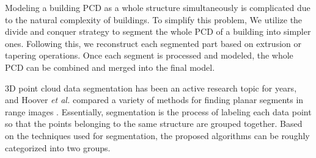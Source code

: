 Modeling a building PCD as a whole structure simultaneously
is complicated due to the natural complexity of buildings.
To simplify this problem,
We utilize the divide and conquer strategy
to segment the whole PCD of a building into simpler ones.
Following this, we reconstruct each segmented
part based on extrusion or tapering operations.
Once each segment is processed and modeled,
the whole PCD can be combined and merged into the final model.

3D point cloud data segmentation has been an active research topic for years,
and Hoover {\it et al.} compared a variety of methods
for finding planar segments in range images \cite{MS_HOO}.
Essentially, segmentation is the process of labeling each data point
so that the points belonging to the same structure are grouped together.
Based on the techniques used for segmentation,
the proposed algorithms can be roughly categorized into two groups.

